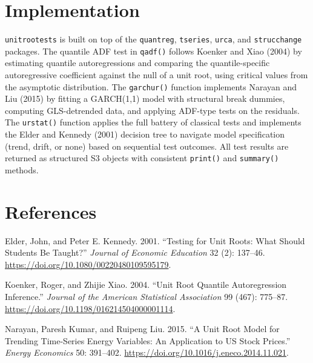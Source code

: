 \section{Implementation}\label{implementation}

\texttt{unitrootests} is built on top of the \texttt{quantreg},
\texttt{tseries}, \texttt{urca}, and \texttt{strucchange} packages. The
quantile ADF test in \texttt{qadf()} follows Koenker and Xiao (2004) by
estimating quantile autoregressions and comparing the quantile-specific
autoregressive coefficient against the null of a unit root, using
critical values from the asymptotic distribution. The \texttt{garchur()}
function implements Narayan and Liu (2015) by fitting a GARCH(1,1) model
with structural break dummies, computing GLS-detrended data, and
applying ADF-type tests on the residuals. The \texttt{urstat()} function
applies the full battery of classical tests and implements the Elder and
Kennedy (2001) decision tree to navigate model specification (trend,
drift, or none) based on sequential test outcomes. All test results are
returned as structured S3 objects with consistent \texttt{print()} and
\texttt{summary()} methods.

\section*{References}\label{references}

\protect{}\label{refs}
\begin{CSLReferences}{1}{1}
Elder, John, and Peter E. Kennedy. 2001. {``Testing for Unit Roots: What
Should Students Be Taught?''} \emph{Journal of Economic Education} 32
(2): 137--46. \url{https://doi.org/10.1080/00220480109595179}.

Koenker, Roger, and Zhijie Xiao. 2004. {``Unit Root Quantile
Autoregression Inference.''} \emph{Journal of the American Statistical
Association} 99 (467): 775--87.
\url{https://doi.org/10.1198/016214504000001114}.

Narayan, Paresh Kumar, and Ruipeng Liu. 2015. {``A Unit Root Model for
Trending Time-Series Energy Variables: An Application to {US} Stock
Prices.''} \emph{Energy Economics} 50: 391--402.
\url{https://doi.org/10.1016/j.eneco.2014.11.021}.

\end{CSLReferences}
